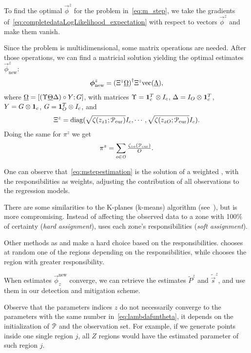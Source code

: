 \documentclass[../main.tex]{subfiles}
\begin{document}
To find the optimal $\vec{\phi}^{z}$ for the problem in~\eqref{eq:m_step}, we
take the gradients of~\eqref{eq:completedataLogLikelihood_expectation} with respect to vectors $\vec{\phi}^{z}$ and make them vanish.

Since the problem is multidimensional, some matrix operations are needed.
After those operations, we can find a matricial solution yielding the optimal estimates $\vec{\phi}^{z}_{\mathrm{new}}$:
\begin{equation}
  \label{eq:mstepestimation}
  \boldsymbol{\phi}^{z}_{\mathrm{new}}={(\Xi^{z}\underline{\Omega})}^{\dagger}\Xi^{z}\mathrm{vec} (\underline{\Lambda}),
\end{equation}
where
${\underline{\Omega}=[(\Upsilon \underline{\Theta}\Delta)\circ Y;G]}$,
with matrices
${\Upsilon=\mathbf{1}_{c}^{T}\otimes I_{c}}$,
${\Delta=I_{O}\otimes\mathbf{1}_{c}^{T}}$,
${Y=G\otimes\mathbf{1}_{c}}$,
${G=\mathbf{1}_{O}^{T}\otimes I_{c}}$,
and
\[{\Xi^{z}={\operatorname{diag}(\sqrt{{\zeta(z_{z1};\mathcal{P}_{\mathrm{cur}})}}I_{c},\cdots,\sqrt{{\zeta(z_{zO};\mathcal{P}_{\mathrm{cur}})}}I_{c})}}.\]
Doing the same for $\pi^{z}$ we get
\begin{equation*}
  \label{eq:3}
  \pi^{z}=\sum\limits_{o\in\mathcal{O}}\tfrac{\zeta_{zo}(\mathcal{P}_{\mathrm{cur}})}{O}.
\end{equation*}

One can observe that~\eqref{eq:mstepestimation} is the solution of a weighted \LS{}, with the responsibilities as weights, adjusting the contribution of all observations to the regression models.

There are some similarities to the K-planes (k-means) algorithm (see~\cite{BradleyMangasarian2000}), but \EM{} is more compromising.
Instead of affecting the observed data to a zone with 100\% of certainty (\emph{hard assignment}), \EM{} uses each zone's responsibilities (\emph{soft assignment}).

Other methods as \sEM{} and \CEM{} make a hard choice based on the responsibilities.
\sEM{} chooses at random one of the regions depending on the responsibilities, while \CEM{} chooses the region with greater responsibility.

When estimates $\vec{\phi}_{z}^{\mathrm{new}}$ converge, we can retrieve the estimates $\tilde{P}^{z}$ and $\tilde{\vec{s}}^{z}$, and use them in our detection and mitigation scheme.

\begin{remark}
  Observe that the parameters indices $z$ do not necessarily converge to the parameters with the same number in~\eqref{eq:lambdafuntheta}, it depends on the initialization of $\mathcal{P}$ and the observation set.
  For example, if we generate points inside one single region $j$, all $Z$ regions would have the estimated parameter of such region $j$.
\end{remark}
\end{document}
